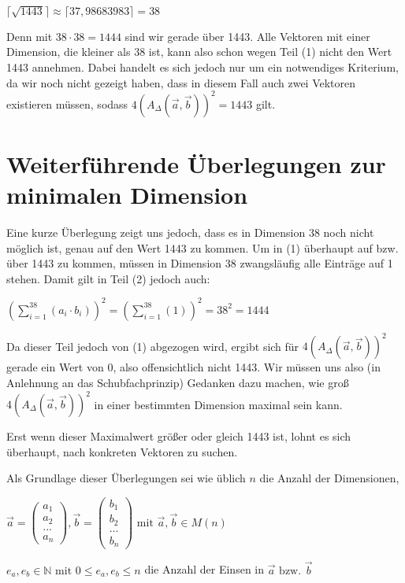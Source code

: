 \documentclass{article}
\newcommand{\sumN}[2]{\ensuremath{\sum\limits_{#1}^{#2}}}
\newcommand{\inN}[1]{\ensuremath{#1 \in \mathds{N}}}
\begin{document}
$\lceil \sqrt{1443} \rceil \approx \lceil 37,98683983 \rceil = 38$

Denn mit $38 \cdot 38 = 1444$ sind wir gerade über 1443. Alle Vektoren mit einer Dimension, die kleiner als 38 ist, kann also schon wegen Teil (1) nicht den Wert 1443 annehmen. Dabei handelt es sich jedoch nur um ein notwendiges Kriterium, da wir noch nicht gezeigt haben, dass in diesem Fall auch zwei Vektoren existieren müssen, sodass $4(A_\Delta(\vec a,\vec b))^2 = 1443$ gilt.

\section{Weiterführende Überlegungen zur minimalen Dimension}

Eine kurze Überlegung zeigt uns jedoch, dass es in Dimension 38 noch nicht möglich ist, genau auf den Wert 1443 zu kommen. Um in (1) überhaupt auf bzw. über 1443 zu kommen, müssen in Dimension 38 zwangsläufig alle Einträge auf 1 stehen. Damit gilt in Teil (2) jedoch auch:

$(\sumN{i=1}{38}(a_i \cdot b_i))^2 = (\sumN{i=1}{38}(1))^2 = 38^2 = 1444$

Da dieser Teil jedoch von (1) abgezogen wird, ergibt sich für $4(A_\Delta(\vec a,\vec b))^2$ gerade ein Wert von 0, also offensichtlich nicht 1443. Wir müssen uns also (in Anlehnung an das Schubfachprinzip) Gedanken dazu machen, wie groß $4(A_\Delta(\vec a,\vec b))^2$ in einer bestimmten Dimension maximal sein kann. 

Erst wenn dieser Maximalwert größer oder gleich 1443 ist, lohnt es sich überhaupt, nach konkreten Vektoren zu suchen.

Als Grundlage dieser Überlegungen sei wie üblich $n$ die Anzahl der Dimensionen,

$\vec a = \begin{pmatrix}a_1\\a_2\\...\\a_{n}\end{pmatrix}, \vec b = \begin{pmatrix}b_1\\b_2\\...\\b_{n}\end{pmatrix} \text{ mit } \vec a, \vec b \in M(n)$

$\inN{e_a, e_b} \text{ mit } 0 \leq e_a,e_b \leq n$ die Anzahl der Einsen in $\vec a \text{ bzw. } \vec b$
\end{document}
